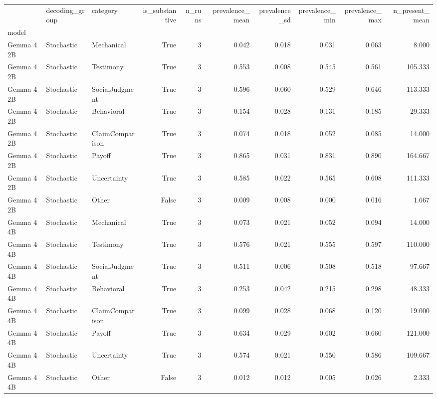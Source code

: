 \begin{tabular}{lllrrrrrrr}
\toprule
 & decoding\_group & category & is\_substantive & n\_runs & prevalence\_mean & prevalence\_sd & prevalence\_min & prevalence\_max & n\_present\_mean \\
model &  &  &  &  &  &  &  &  &  \\
\midrule
Gemma 4 2B & Stochastic & Mechanical & True & 3 & 0.042 & 0.018 & 0.031 & 0.063 & 8.000 \\
Gemma 4 2B & Stochastic & Testimony & True & 3 & 0.553 & 0.008 & 0.545 & 0.561 & 105.333 \\
Gemma 4 2B & Stochastic & SocialJudgment & True & 3 & 0.596 & 0.060 & 0.529 & 0.646 & 113.333 \\
Gemma 4 2B & Stochastic & Behavioral & True & 3 & 0.154 & 0.028 & 0.131 & 0.185 & 29.333 \\
Gemma 4 2B & Stochastic & ClaimComparison & True & 3 & 0.074 & 0.018 & 0.052 & 0.085 & 14.000 \\
Gemma 4 2B & Stochastic & Payoff & True & 3 & 0.865 & 0.031 & 0.831 & 0.890 & 164.667 \\
Gemma 4 2B & Stochastic & Uncertainty & True & 3 & 0.585 & 0.022 & 0.565 & 0.608 & 111.333 \\
Gemma 4 2B & Stochastic & Other & False & 3 & 0.009 & 0.008 & 0.000 & 0.016 & 1.667 \\
Gemma 4 4B & Stochastic & Mechanical & True & 3 & 0.073 & 0.021 & 0.052 & 0.094 & 14.000 \\
Gemma 4 4B & Stochastic & Testimony & True & 3 & 0.576 & 0.021 & 0.555 & 0.597 & 110.000 \\
Gemma 4 4B & Stochastic & SocialJudgment & True & 3 & 0.511 & 0.006 & 0.508 & 0.518 & 97.667 \\
Gemma 4 4B & Stochastic & Behavioral & True & 3 & 0.253 & 0.042 & 0.215 & 0.298 & 48.333 \\
Gemma 4 4B & Stochastic & ClaimComparison & True & 3 & 0.099 & 0.028 & 0.068 & 0.120 & 19.000 \\
Gemma 4 4B & Stochastic & Payoff & True & 3 & 0.634 & 0.029 & 0.602 & 0.660 & 121.000 \\
Gemma 4 4B & Stochastic & Uncertainty & True & 3 & 0.574 & 0.021 & 0.550 & 0.586 & 109.667 \\
Gemma 4 4B & Stochastic & Other & False & 3 & 0.012 & 0.012 & 0.005 & 0.026 & 2.333 \\
\bottomrule
\end{tabular}
